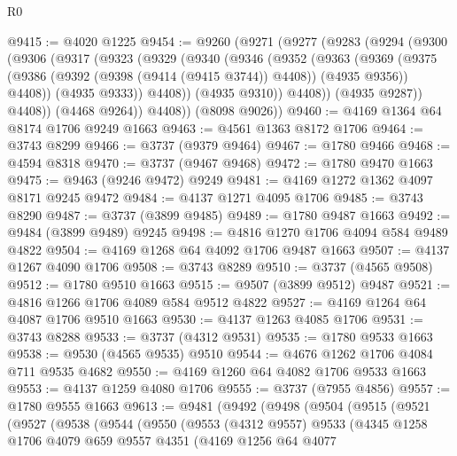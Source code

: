 \begin{lexlean}{R0}
\begin{coremodule}
@9415 := @4020 @1225
@9454 := @9260
    (@9271
      (@9277
        (@9283
          (@9294
            (@9300
              (@9306
                (@9317
                  (@9323
                    (@9329
                      (@9340
                        (@9346
                          (@9352
                            (@9363
                              (@9369
                                (@9375
                                  (@9386 (@9392 (@9398 (@9414 (@9415 @3744)) @4408)) (@4935 @9356))
                                  @4408))
                              (@4935 @9333))
                            @4408))
                        (@4935 @9310))
                      @4408))
                  (@4935 @9287))
                @4408))
            (@4468 @9264))
          @4408))
      (@8098 @9026))
@9460 := @4169 @1364 @64 @8174 @1706 @9249 @1663
@9463 := @4561 @1363 @8172 @1706
@9464 := @3743 @8299
@9466 := @3737 (@9379 @9464)
@9467 := @1780 @9466
@9468 := @4594 @8318
@9470 := @3737 (@9467 @9468)
@9472 := @1780 @9470 @1663
@9475 := @9463 (@9246 @9472) @9249
@9481 := @4169 @1272 @1362 @4097 @8171 @9245 @9472
@9484 := @4137 @1271 @4095 @1706
@9485 := @3743 @8290
@9487 := @3737 (@3899 @9485)
@9489 := @1780 @9487 @1663
@9492 := @9484 (@3899 @9489) @9245
@9498 := @4816 @1270 @1706 @4094 @584 @9489 @4822
@9504 := @4169 @1268 @64 @4092 @1706 @9487 @1663
@9507 := @4137 @1267 @4090 @1706
@9508 := @3743 @8289
@9510 := @3737 (@4565 @9508)
@9512 := @1780 @9510 @1663
@9515 := @9507 (@3899 @9512) @9487
@9521 := @4816 @1266 @1706 @4089 @584 @9512 @4822
@9527 := @4169 @1264 @64 @4087 @1706 @9510 @1663
@9530 := @4137 @1263 @4085 @1706
@9531 := @3743 @8288
@9533 := @3737 (@4312 @9531)
@9535 := @1780 @9533 @1663
@9538 := @9530 (@4565 @9535) @9510
@9544 := @4676 @1262 @1706 @4084 @711 @9535 @4682
@9550 := @4169 @1260 @64 @4082 @1706 @9533 @1663
@9553 := @4137 @1259 @4080 @1706
@9555 := @3737 (@7955 @4856)
@9557 := @1780 @9555 @1663
@9613 := @9481
    (@9492
      (@9498
        (@9504
          (@9515
            (@9521
              (@9527
                (@9538
                  (@9544
                    (@9550
                      (@9553
                        (@4312 @9557)
                        @9533
                        (@4345
                          @1258
                          @1706
                          @4079
                          @659
                          @9557
                          @4351
                          (@4169
                            @1256
                            @64
                            @4077

\end{coremodule}
\end{lexlean}
